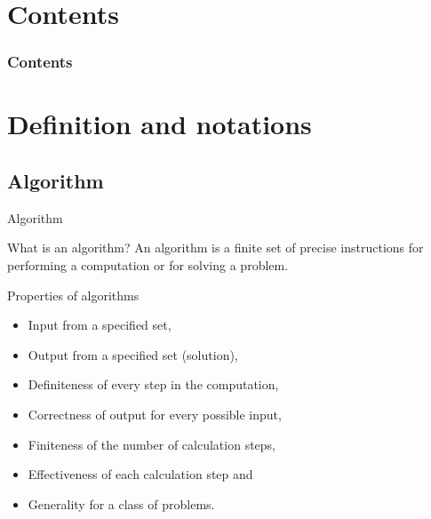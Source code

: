 \documentclass[english,10pt,table]{beamer}
\begin{document}
\begin{frame}
  \maketitle
\end{frame}

\section*{Contents}
\begin{frame}\frametitle<presentation>{Contents}
  \tableofcontents
\end{frame}


\section{Definition and notations}
\subsection{Algorithm}
\begin{frame}{Algorithm}		
	\begin{block}{What is an algorithm?}
	 An algorithm is a finite set of precise instructions for performing a computation or for solving a problem.
  \end{block}	
\pause
		
	\begin{block}{Properties of algorithms}
	 \begin{itemize}
		 \item \alert{Input} from a specified set,
		 \item \alert{Output} from a specified set (solution),
		 \item \alert{Definiteness} of every step in the computation,
		 \item \alert{Correctness} of output for every possible input,
		 \item \alert{Finiteness} of the number of calculation steps,
		 \item \alert{Effectiveness} of each calculation step and
		 \item \alert{Generality} for a class of problems.
   \end{itemize}
  \end{block}	
\end{frame}

\end{document}
